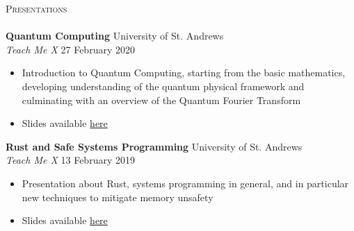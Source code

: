 \documentclass[a4paper]{article}
\newcommand{\lineunder} {
    \vspace*{-8pt} \\
    \hspace*{-18pt} \hrulefill \\
}
\newcommand{\header} [1] {
    {\hspace*{-18pt}\vspace*{6pt} \textsc{#1}}
    \vspace*{-6pt} \lineunder
}
\begin{document}
\header{Presentations}

\textbf{Quantum Computing} \hfill University of St. Andrews \\
\textit{Teach Me X} \hfill{27 February 2020}
\vspace{-1mm}
\begin{itemize} \itemsep 1pt
    \item Introduction to Quantum Computing, starting from the basic mathematics, developing understanding of the quantum physical framework
    and culminating with an overview of the Quantum Fourier Transform
    \item Slides available \href{https://github.com/WizardOfMenlo/QuantumPresentationTMX}{here} 
\end{itemize}

\textbf{Rust and Safe Systems Programming} \hfill University of St. Andrews \\
\textit{Teach Me X} \hfill{13 February 2019}
\vspace{-1mm}
\begin{itemize} \itemsep 1pt
    \item Presentation about Rust, systems programming in general, and in particular new techniques to mitigate memory unsafety
    \item Slides available \href{https://docs.google.com/presentation/d/1ui4ByY8qFhqAsdYoyPBPzhyg8AbV5YJKAN9sNwv5QPw/edit?usp=sharing}{here} 
\end{itemize}
\end{document}
